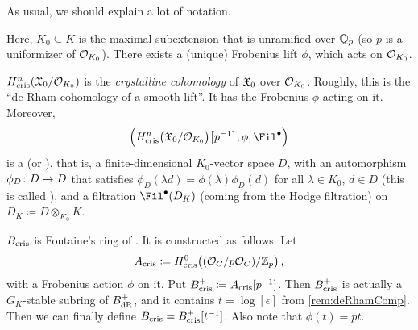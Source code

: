 \documentclass[a4paper, 10pt, oneside, DIV=9, chapterprefix=true, numbers=enddot,bibliography=totoc]{scrbook}
\begin{document}
\begin{rem}
	As usual, we should explain a lot of notation.
	\begin{numerate}
		\item Here, $K_0\subseteq K$ is the maximal subextension that is unramified over $\mathbb{Q}_p$ (so $p$ is a uniformizer of $\mathcal{O}_{K_0}$). There exists a (unique) Frobenius lift $\phi$, which acts on $\mathcal{O}_{K_0}$.
		\item $H_{\mathrm{cris}}^n(\mathfrak{X}_0/\mathcal{O}_{K_0})$ is the \emph{crystalline cohomology} of $\mathfrak{X}_0$ over $\mathcal{O}_{K_0}$. Roughly, this is the \enquote{de Rham cohomology of a smooth lift}. It has the Frobenius $\phi$ acting on it. Moreover,
		\begin{equation*}
			\Big(H_\cris^n\big(\XX_0/\Oo_{K_0}\big)\big[p^{-1}\big], \phi, \Fil^\bullet\Big)
		\end{equation*}
		is a  (or ), that is, a finite-dimensional $K_0$-vector space $D$, with an automorphism $\phi_D\colon D\morphism D$ that satisfies $\phi_D(\lambda d)=\phi(\lambda)\phi_D(d)$ for all $\lambda\in K_0$, $d\in D$ (this is called ), and a filtration $\Fil^\bullet(D_K)$ (coming from the Hodge filtration) on $D_K\coloneqq D\otimes_{K_0}K$.
		\item $B_{\mathrm{cris}}$ is Fontaine's ring of . It is constructed as follows. Let
		\begin{equation*}
			A_{\mathrm{cris}}\coloneqq H_{\mathrm{cris}}^0\big((\mathcal{O}_C/p\mathcal{O}_C)/\mathbb{Z}_p\big)\,,
		\end{equation*}
		with a Frobenius action $\phi$ on it. Put $B_{\mathrm{cris}}^+\coloneqq A_{\mathrm{cris}}[p^{-1}]$. Then $B_{\mathrm{cris}}^+$ is actually a $G_K$-stable subring of $B_{\mathrm{dR}}^+$, and it contains $t=\log{}[\epsilon]$ from \cref{rem:deRhamComp}. Then we can finally define $B_{\mathrm{cris}}=B_{\mathrm{cris}}^+[t^{-1}]$. Also note that $\phi(t)=pt$.
		

\end{numerate}
\end{rem}
\end{document}
